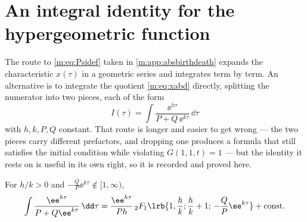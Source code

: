 \section{An integral identity for the hypergeometric function}
\label{m:app:hyp}

The route to \cref{m:eq:Psidef} taken in \cref{m:app:absbirthdeath} expands the
characteristic $x(\tau)$ in a geometric series and integrates term by term. An
alternative is to integrate the quotient \cref{m:eq:xabd} directly, splitting the
numerator into two pieces, each of the form
\begin{equation}
\label{m:eq:Iform}
I(\tau) = \int\frac{\ee^{h\tau}}{P+Q\,\ee^{k\tau}}\,\dd\tau
\end{equation}
with $h,k,P,Q$ constant. That route is longer and easier to get wrong --- the two
pieces carry different prefactors, and dropping one produces a formula that still
satisfies the initial condition while violating $G(1,1,t)=1$ --- but the identity it
rests on is useful in its own right, so it is recorded and proved here.

\begin{proposition}
\label{m:prop:hypIden}
For $h/k>0$ and $-\tfrac{Q}{P}\ee^{k\tau}\notin[1,\infty)$,
\begin{equation}
\label{m:eq:hypIden}
\int\frac{\ee^{h\tau}}{P+Q\ee^{k\tau}}\,\dd\tau
= \frac{\ee^{h\tau}}{Ph}\,{}_2F_1\lrb{1,\frac{h}{k};\frac{h}{k}+1;\,-\frac{Q}{P}\ee^{k\tau}}
+ \text{const} .
\end{equation}
\end{proposition}

